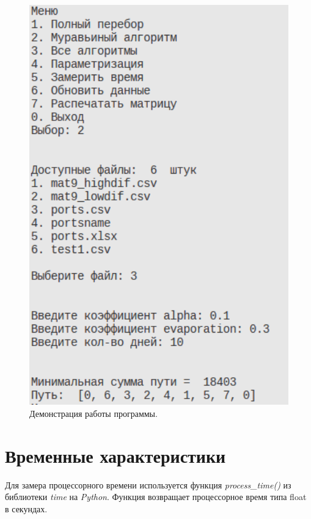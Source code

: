 \begin{figure}[ht!]
	\centering
	\includegraphics[width=170mm]{inc/img/img_prog.png}
	\caption{Демонстрация работы программы.\label{overflow}}
	\label{fig:img_prog}
	\end{figure}


\clearpage

\section{Временные характеристики}

Для замера процессорного времени используется функция \textit{process\_time()} из библиотеки \textit{time} на \textit{Python}. Функция возвращает процессорное время типа float в секундах.

